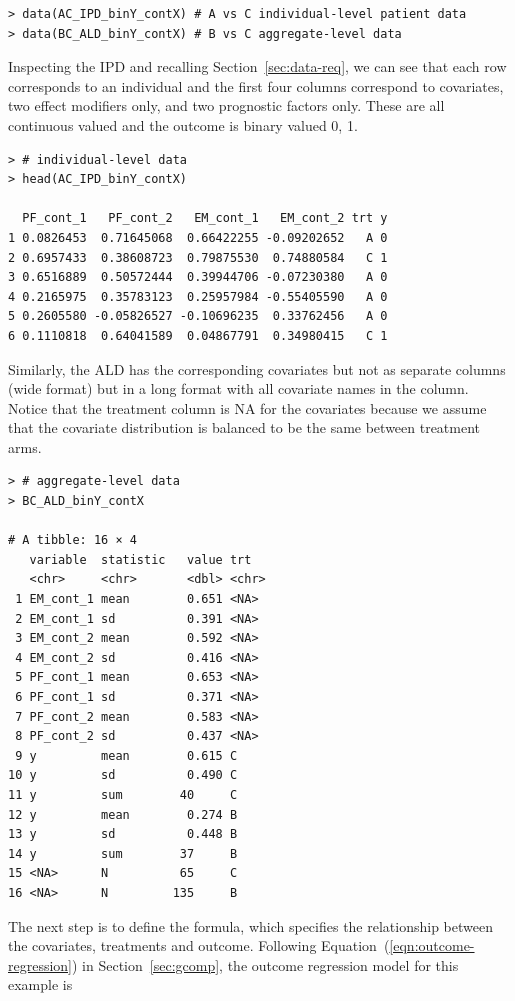 \documentclass[article]{jss}
\begin{document}
\begin{verbatim}
> data(AC_IPD_binY_contX) # A vs C individual-level patient data
> data(BC_ALD_binY_contX) # B vs C aggregate-level data
\end{verbatim}

Inspecting the IPD and recalling Section~\ref{sec:data-req}, we can see that each row corresponds to an individual and the first four columns correspond to covariates, two effect modifiers only, and two prognostic factors only. These are all continuous valued and the outcome is binary valued 0, 1.

\begin{verbatim}
> # individual-level data
> head(AC_IPD_binY_contX)

  PF_cont_1   PF_cont_2   EM_cont_1   EM_cont_2 trt y    
1 0.0826453  0.71645068  0.66422255 -0.09202652   A 0 
2 0.6957433  0.38608723  0.79875530  0.74880584   C 1  
3 0.6516889  0.50572444  0.39944706 -0.07230380   A 0 
4 0.2165975  0.35783123  0.25957984 -0.55405590   A 0 
5 0.2605580 -0.05826527 -0.10696235  0.33762456   A 0 
6 0.1110818  0.64041589  0.04867791  0.34980415   C 1 
\end{verbatim}

Similarly, the ALD has the corresponding covariates but not as separate columns (wide format) but in a long format with all covariate names in the  column.  Notice that the treatment column  is NA for the covariates because we assume that the covariate distribution is balanced to be the same between treatment arms.

\begin{verbatim}
> # aggregate-level data
> BC_ALD_binY_contX

# A tibble: 16 × 4
   variable  statistic   value trt  
   <chr>     <chr>       <dbl> <chr>
 1 EM_cont_1 mean        0.651 <NA> 
 2 EM_cont_1 sd          0.391 <NA> 
 3 EM_cont_2 mean        0.592 <NA> 
 4 EM_cont_2 sd          0.416 <NA> 
 5 PF_cont_1 mean        0.653 <NA> 
 6 PF_cont_1 sd          0.371 <NA> 
 7 PF_cont_2 mean        0.583 <NA> 
 8 PF_cont_2 sd          0.437 <NA> 
 9 y         mean        0.615 C    
10 y         sd          0.490 C    
11 y         sum        40     C    
12 y         mean        0.274 B    
13 y         sd          0.448 B    
14 y         sum        37     B    
15 <NA>      N          65     C    
16 <NA>      N         135     B
\end{verbatim}

The next step is to define the formula, which specifies the relationship between the covariates, treatments and outcome.
Following Equation~(\ref{eqn:outcome-regression}) in Section~\ref{sec:gcomp}, the outcome regression model for this example is
\end{document}
